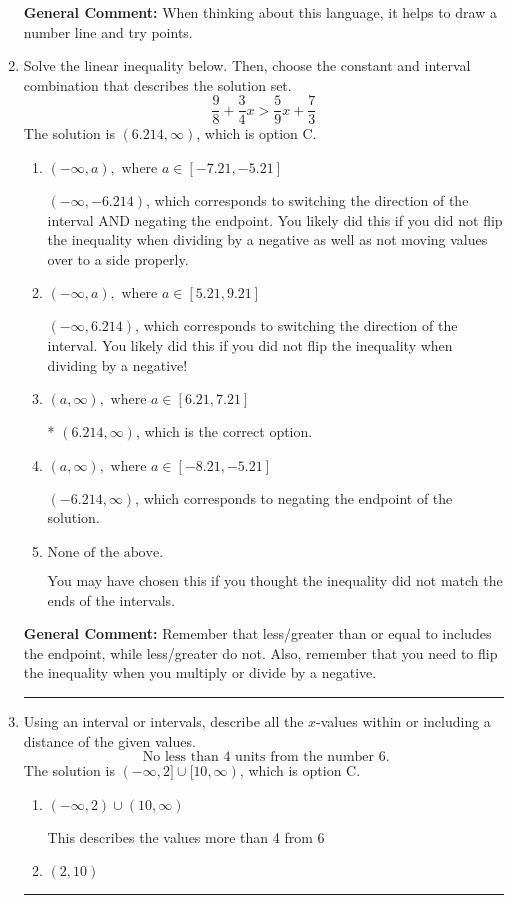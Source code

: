 \documentclass{extbook}[14pt]
\newcommand{\litem}[1]{\item #1

\rule{\textwidth}{0.4pt}}
\begin{document}
\begin{enumerate}
{\textbf{General Comment:} When thinking about this language, it helps to draw a number line and try points.
}
\litem{
Solve the linear inequality below. Then, choose the constant and interval combination that describes the solution set.
\[ \frac{9}{8} + \frac{3}{4} x > \frac{5}{9} x + \frac{7}{3} \]The solution is \( (6.214, \infty) \), which is option C.\begin{enumerate}[label=\Alph*.]
\item \( (-\infty, a), \text{ where } a \in [-7.21, -5.21] \)

 $(-\infty, -6.214)$, which corresponds to switching the direction of the interval AND negating the endpoint. You likely did this if you did not flip the inequality when dividing by a negative as well as not moving values over to a side properly.
\item \( (-\infty, a), \text{ where } a \in [5.21, 9.21] \)

 $(-\infty, 6.214)$, which corresponds to switching the direction of the interval. You likely did this if you did not flip the inequality when dividing by a negative!
\item \( (a, \infty), \text{ where } a \in [6.21, 7.21] \)

* $(6.214, \infty)$, which is the correct option.
\item \( (a, \infty), \text{ where } a \in [-8.21, -5.21] \)

 $(-6.214, \infty)$, which corresponds to negating the endpoint of the solution.
\item \( \text{None of the above}. \)

You may have chosen this if you thought the inequality did not match the ends of the intervals.
\end{enumerate}

\textbf{General Comment:} Remember that less/greater than or equal to includes the endpoint, while less/greater do not. Also, remember that you need to flip the inequality when you multiply or divide by a negative.
}
\litem{
Using an interval or intervals, describe all the $x$-values within or including a distance of the given values.
\[ \text{ No less than } 4 \text{ units from the number } 6. \]The solution is \( (-\infty, 2] \cup [10, \infty) \), which is option C.\begin{enumerate}[label=\Alph*.]
\item \( (-\infty, 2) \cup (10, \infty) \)

This describes the values more than 4 from 6
\item \( (2, 10) \)


\end{enumerate}}
\end{enumerate}
\end{document}
